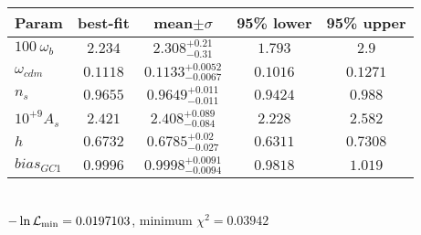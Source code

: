 \begin{tabular}{|l|c|c|c|c|} 
 \hline 
Param & best-fit & mean$\pm\sigma$ & 95\% lower & 95\% upper \\ \hline 
$100~\omega_{b }$ &$2.234$ & $2.308_{-0.31}^{+0.21}$ & $1.793$ & $2.9$ \\ 
$\omega_{cdm }$ &$0.1118$ & $0.1133_{-0.0067}^{+0.0052}$ & $0.1016$ & $0.1271$ \\ 
$n_{s }$ &$0.9655$ & $0.9649_{-0.011}^{+0.011}$ & $0.9424$ & $0.988$ \\ 
$10^{+9}A_{s }$ &$2.421$ & $2.408_{-0.084}^{+0.089}$ & $2.228$ & $2.582$ \\ 
$h$ &$0.6732$ & $0.6785_{-0.027}^{+0.02}$ & $0.6311$ & $0.7308$ \\ 
$bias_{GC 1 }$ &$0.9996$ & $0.9998_{-0.0094}^{+0.0091}$ & $0.9818$ & $1.019$ \\ 
\hline 
 \end{tabular} \\ 
$-\ln{\cal L}_\mathrm{min} =0.0197103$, minimum $\chi^2=0.03942$ \\ 
